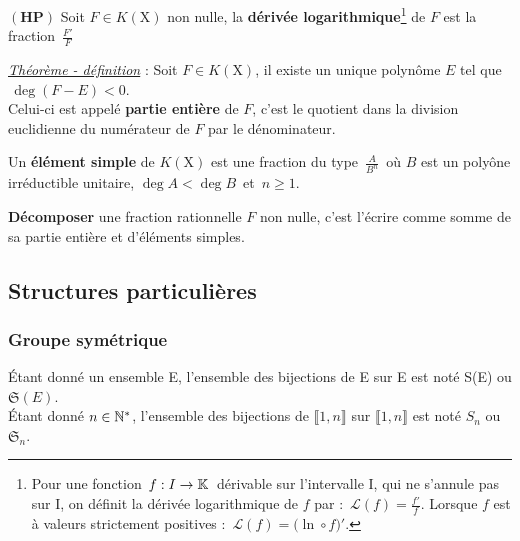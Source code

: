 \vspace{0.3cm}

$\left(\mathbf{HP}\right)$ Soit \(F\in K(\text{X})\) non nulle, la \textbf{dérivée logarithmique}\footnote{Pour une fonction \(\,f:I\to\mathbb{K}\,\) dérivable sur l'intervalle I, qui ne s'annule pas sur I, on définit la dérivée logarithmique de $f$ par : \(\,\displaystyle \mathcal{L}(f)=\frac{f'}{f}\). Lorsque $f$ est à valeurs strictement positives : \(\,\mathcal{L}(f)=\bigl(\ln\circ f\bigr)'\).} de $F$ est la fraction \(\,\displaystyle\frac{F'}{F}\)

\vspace{1cm}

\underline{\emph{Théorème - définition}} : Soit $F\in K(\text{X})$, il existe un unique polynôme $E$ tel que $\,\deg (F-E)<0$. \\Celui-ci est appelé \textbf{partie entière} de $F$, c'est le quotient dans la division euclidienne du numérateur de $F$ par le dénominateur.

\vspace{0.5cm}

Un \textbf{élément simple} de \(K(\text{X})\) est une fraction du type \(\,\displaystyle\frac{A}{B^n}\,\) où $B$ est un polyône irréductible unitaire, \(\deg A < \deg B\,\) et \(\,n\geq 1\).

\vspace{1cm}

\textbf{Décomposer} une fraction rationnelle $F$ non nulle, c'est l'écrire comme somme de sa partie entière et d'éléments simples.

\vspace{2cm}

\subsection{Structures particulières}

\vspace{0.7cm}

\subsubsection{Groupe symétrique}

\vspace{0.7cm}

Étant donné un ensemble E, l'ensemble des bijections de E sur E est noté S(E) ou $\mathfrak{S}(E)$.\\
Étant donné \(n\in \mathbb{N}^*\), l'ensemble des bijections de \(\llbracket 1,n\rrbracket\) sur \(\llbracket 1,n\rrbracket\) est noté $S_n$ ou $\mathfrak{S}_n$.

